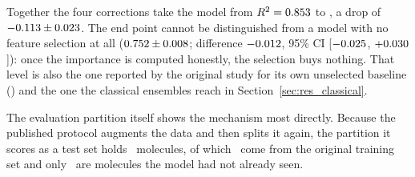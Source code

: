 \begin{table}[htbp]
	\centering
	\caption{Performance of the original pipeline as each information leak is removed, over \KarReproNSeeds\ seeds. $\Delta R^2$ is the change with respect to the rung above, with its 95\% bootstrap confidence interval over the \KarLadderNCommonTest\ molecules common to rungs R1--R4. R0 builds its own evaluation partition by re-splitting the augmented data, so it shares no test molecules with the rungs below and the difference of R1, which is measured against it, cannot be paired: \textsuperscript{a}~that one entry is given as the mean over seeds with its standard deviation instead of a bootstrap interval. The last row is a model with no feature selection, fitted on the same clean split; \textsuperscript{b}~its entry is the difference of R4 with respect to it, not a step of the ladder.}
	\label{tab:ladder}
\end{table}

Together the four corrections take the model from $R^2 = 0.853$ to \KarLadderRungFourRTwoMean, a
drop of $-0.113 \pm 0.023$. The end point cannot be distinguished
from a model with no feature selection at all ($0.752 \pm 0.008$;
difference $-0.012$, 95\% CI [$-0.025$,
$+0.030$]): once the importance is computed honestly, the selection buys nothing. That
level is also the one reported by the original study for its own unselected baseline (\PaperBaselineRTwo) and the one
the classical ensembles reach in Section~\ref{sec:res_classical}.

The evaluation partition itself shows the mechanism most directly. Because the published protocol augments the data and
then splits it again, the partition it scores as a test set holds \KarRZeroNScored\ molecules, of which
\KarRZeroFromOriginalTrain\ come from the original training set and only \KarRZeroFromOriginalTest\ are molecules the
model had not already seen.

